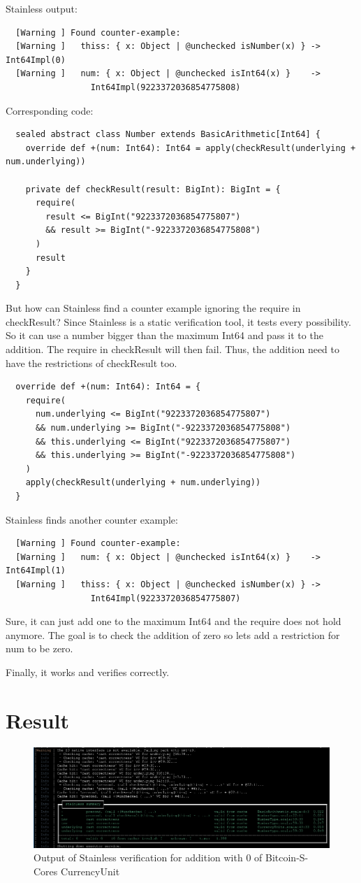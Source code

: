 Stainless output:
\begin{lstlisting}
  [Warning ] Found counter-example:
  [Warning ]   thiss: { x: Object | @unchecked isNumber(x) } -> Int64Impl(0)
  [Warning ]   num: { x: Object | @unchecked isInt64(x) }    -> 
                 Int64Impl(9223372036854775808)
\end{lstlisting}
Corresponding code:
\begin{lstlisting}
  sealed abstract class Number extends BasicArithmetic[Int64] {
    override def +(num: Int64): Int64 = apply(checkResult(underlying + num.underlying))

    private def checkResult(result: BigInt): BigInt = {
      require(
        result <= BigInt("9223372036854775807")
        && result >= BigInt("-9223372036854775808")
      )
      result
    }
  }
\end{lstlisting}
But how can Stainless find a counter example ignoring the require in checkResult?
Since Stainless is a static verification tool, it tests every possibility.
So it can use a number bigger than the maximum Int64 and pass it to the addition.
The require in checkResult will then fail.
Thus, the addition need to have the restrictions of checkResult too.
\begin{lstlisting}
  override def +(num: Int64): Int64 = {
    require(
      num.underlying <= BigInt("9223372036854775807")
      && num.underlying >= BigInt("-9223372036854775808")
      && this.underlying <= BigInt("9223372036854775807")
      && this.underlying >= BigInt("-9223372036854775808")
    )
    apply(checkResult(underlying + num.underlying))
  }
\end{lstlisting}
Stainless finds another counter example:
\begin{lstlisting}
  [Warning ] Found counter-example:
  [Warning ]   num: { x: Object | @unchecked isInt64(x) }    -> Int64Impl(1)
  [Warning ]   thiss: { x: Object | @unchecked isNumber(x) } ->
                 Int64Impl(9223372036854775807)
\end{lstlisting}
Sure, it can just add one to the maximum Int64 and the require does not hold anymore.
The goal is to check the addition of zero so lets add a restriction for num to be zero.

Finally, it works and verifies correctly.

\section{Result}
\begin{figure}[H]
	\centering
		\includegraphics[scale=0.45]{images/final_verify_output.png}
	\caption{Output of Stainless verification for addition with 0 of Bitcoin-S-Cores CurrencyUnit}
	\label{fig:output1}
\end{figure}
